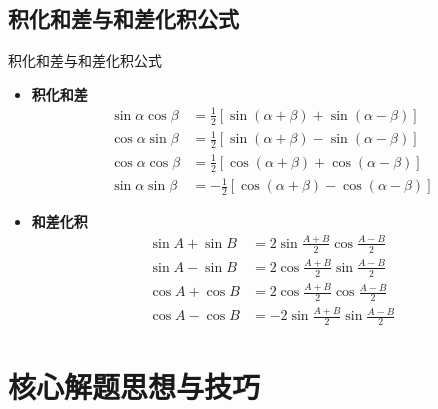 \documentclass[a4paper,11pt]{ctexart}
\begin{document}
\subsection{积化和差与和差化积公式}
\begin{theorembox}{积化和差与和差化积公式}
\begin{itemize}
    \item \textbf{积化和差}
    \begin{align*}
        \sin\alpha\cos\beta &= \frac{1}{2}[\sin(\alpha+\beta) + \sin(\alpha-\beta)] \\
        \cos\alpha\sin\beta &= \frac{1}{2}[\sin(\alpha+\beta) - \sin(\alpha-\beta)] \\
        \cos\alpha\cos\beta &= \frac{1}{2}[\cos(\alpha+\beta) + \cos(\alpha-\beta)] \\
        \sin\alpha\sin\beta &= -\frac{1}{2}[\cos(\alpha+\beta) - \cos(\alpha-\beta)]
    \end{align*}
    \item \textbf{和差化积}
    \begin{align*}
        \sin A + \sin B &= 2\sin\frac{A+B}{2}\cos\frac{A-B}{2} \\
        \sin A - \sin B &= 2\cos\frac{A+B}{2}\sin\frac{A-B}{2} \\
        \cos A + \cos B &= 2\cos\frac{A+B}{2}\cos\frac{A-B}{2} \\
        \cos A - \cos B &= -2\sin\frac{A+B}{2}\sin\frac{A-B}{2}
    \end{align*}
\end{itemize}
\end{theorembox}


\newpage
\section{核心解题思想与技巧}

\end{document}
